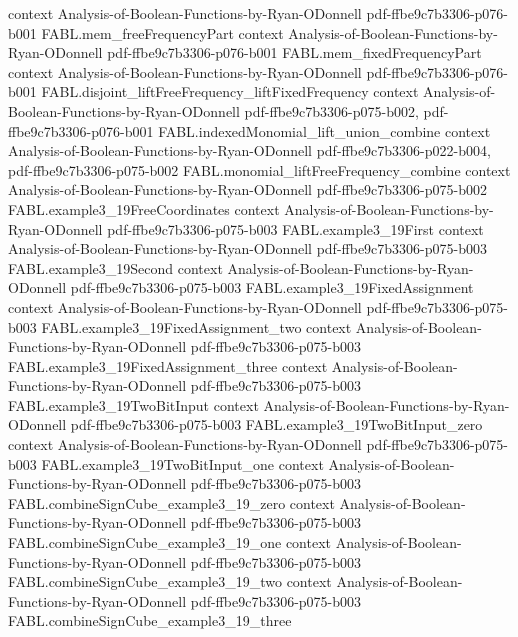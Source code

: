 \begin{theorem}
  {context}
  {Analysis-of-Boolean-Functions-by-Ryan-ODonnell}
  {pdf-ffbe9c7b3306-p076-b001}
\proofstep
  {FABL.mem_freeFrequencyPart}
  {context}
  {Analysis-of-Boolean-Functions-by-Ryan-ODonnell}
  {pdf-ffbe9c7b3306-p076-b001}
\proofstep
  {FABL.mem_fixedFrequencyPart}
  {context}
  {Analysis-of-Boolean-Functions-by-Ryan-ODonnell}
  {pdf-ffbe9c7b3306-p076-b001}
\proofstep
  {FABL.disjoint_liftFreeFrequency_liftFixedFrequency}
  {context}
  {Analysis-of-Boolean-Functions-by-Ryan-ODonnell}
  {pdf-ffbe9c7b3306-p075-b002,
    pdf-ffbe9c7b3306-p076-b001}
\proofstep
  {FABL.indexedMonomial_lift_union_combine}
  {context}
  {Analysis-of-Boolean-Functions-by-Ryan-ODonnell}
  {pdf-ffbe9c7b3306-p022-b004,
    pdf-ffbe9c7b3306-p075-b002}
\proofstep
  {FABL.monomial_liftFreeFrequency_combine}
  {context}
  {Analysis-of-Boolean-Functions-by-Ryan-ODonnell}
  {pdf-ffbe9c7b3306-p075-b002}
\proofstep
  {FABL.example3_19FreeCoordinates}
  {context}
  {Analysis-of-Boolean-Functions-by-Ryan-ODonnell}
  {pdf-ffbe9c7b3306-p075-b003}
\proofstep
  {FABL.example3_19First}
  {context}
  {Analysis-of-Boolean-Functions-by-Ryan-ODonnell}
  {pdf-ffbe9c7b3306-p075-b003}
\proofstep
  {FABL.example3_19Second}
  {context}
  {Analysis-of-Boolean-Functions-by-Ryan-ODonnell}
  {pdf-ffbe9c7b3306-p075-b003}
\proofstep
  {FABL.example3_19FixedAssignment}
  {context}
  {Analysis-of-Boolean-Functions-by-Ryan-ODonnell}
  {pdf-ffbe9c7b3306-p075-b003}
\proofstep
  {FABL.example3_19FixedAssignment_two}
  {context}
  {Analysis-of-Boolean-Functions-by-Ryan-ODonnell}
  {pdf-ffbe9c7b3306-p075-b003}
\proofstep
  {FABL.example3_19FixedAssignment_three}
  {context}
  {Analysis-of-Boolean-Functions-by-Ryan-ODonnell}
  {pdf-ffbe9c7b3306-p075-b003}
\proofstep
  {FABL.example3_19TwoBitInput}
  {context}
  {Analysis-of-Boolean-Functions-by-Ryan-ODonnell}
  {pdf-ffbe9c7b3306-p075-b003}
\proofstep
  {FABL.example3_19TwoBitInput_zero}
  {context}
  {Analysis-of-Boolean-Functions-by-Ryan-ODonnell}
  {pdf-ffbe9c7b3306-p075-b003}
\proofstep
  {FABL.example3_19TwoBitInput_one}
  {context}
  {Analysis-of-Boolean-Functions-by-Ryan-ODonnell}
  {pdf-ffbe9c7b3306-p075-b003}
\proofstep
  {FABL.combineSignCube_example3_19_zero}
  {context}
  {Analysis-of-Boolean-Functions-by-Ryan-ODonnell}
  {pdf-ffbe9c7b3306-p075-b003}
\proofstep
  {FABL.combineSignCube_example3_19_one}
  {context}
  {Analysis-of-Boolean-Functions-by-Ryan-ODonnell}
  {pdf-ffbe9c7b3306-p075-b003}
\proofstep
  {FABL.combineSignCube_example3_19_two}
  {context}
  {Analysis-of-Boolean-Functions-by-Ryan-ODonnell}
  {pdf-ffbe9c7b3306-p075-b003}
\proofstep
  {FABL.combineSignCube_example3_19_three}

\end{theorem}
